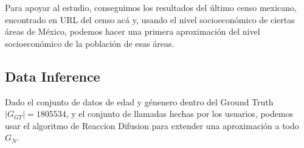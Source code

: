 Para apoyar al estudio, conseguimos los resultados del último censo mexicano, encontrado en {URL del censo acá} y, usando el nivel socioeconómico de ciertas áreas de México, podemos hacer una primera aproximación del nivel socioeconómico de la población de esas áreas.

\subsection{Data Inference}

Dado el conjunto de datos de edad y génenero dentro del Ground Truth \( \left|G_{GT}\right| = 1805534 \), y el conjunto de llamadas hechas por los usuarios, podemos usar el algoritmo de Reaccion Difusion \cite{brea2014} para extender una aproximación a todo \( G_N \).